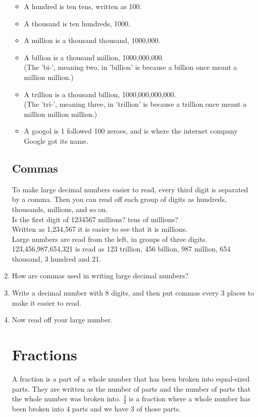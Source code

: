 \documentclass{article}
\begin{document}
\begin{enumerate}
\begin{itemize}
\item A hundred is ten tens, written as 100.
\item A thousand is ten hundreds, 1000.
\item A million is a thousand thousand, 1000,000.
\item A billion is a thousand million, 1000,000,000.\\
(The 'bi-', meaning two, in 'billion' is because a billion once meant a million million.)
\item A trillion is a thousand billion, 1000,000,000,000.\\
(The 'tri-', meaning three, in 'trillion' is because a trillion once meant a million million million.)
\item A googol is 1 followed 100 zeroes, and is where the internet company Google got its name.
\end{itemize}

\subsection*{Commas}
To make large decimal numbers easier to read, every third digit is separated by a comma. Then you can read off each group of digits as hundreds, thousands, millions, and so on.\\

Is the first digit of 1234567 millions? tens of millions?\\

Written as 1,234,567 it is easier to see that it is millions.\\

Large numbers are read from the left, in groups of three digits.\\

123,456,987,654,321 is read as 123 trillion, 456 billion, 987 million, 654 thousand, 3 hundred and 21.\\

\item How are commas used in writing large decimal numbers?
\item Write a decimal number with 8 digits, and then put commas every 3 places to make it easier to read.
\item Now read off your large number.

\newpage

\section*{Fractions}
A fraction is a part of a whole number that has been broken into equal-sized parts. They are written as the number of parts and the number of parts that the whole number was broken into. $\frac{3}{4}$ is a fraction where a whole number has been broken into 4 parts and we have 3 of those parts.


\end{enumerate}
\end{document}
